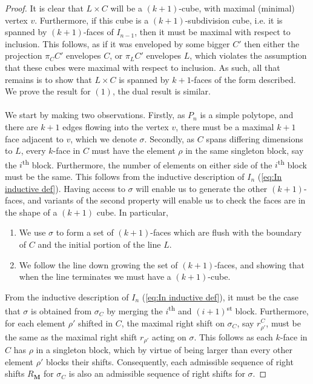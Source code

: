\documentclass{amsart}
\newcommand{\Kurt}[1]{\todo[color=orange!30]{\rm #1 \\ \hfill --- K.}}
\theoremstyle{definition}
\newcommand{\ordinal}{\textsuperscript{th}} %
\newcommand{\ordinalst}{\textsuperscript{st}} %
\begin{document}
\begin{proof}
It is clear that $L \times C$ will be a $(k+1)$-cube, with maximal (minimal) vertex $v$.
Furthermore, if this cube is a $(k+1)$-subdivision cube, i.e. it is spanned by $(k+1)$-faces of $I_{n-1}$, then it must be maximal with respect to inclusion.
This follows, as if it was enveloped by some bigger $C'$ then either the projection $\pi_C C'$ envelopes $C$, or $\pi_L C'$ envelopes $L$, which violates the assumption that these cubes were maximal with respect to inclusion.
As such, all that remains is to show that $L\times C$ is spanned by $k+1$-faces of the form described.
We prove the result for $(1)$, the dual result is similar.
\\\\
We start by making two observations. \Kurt{Could pull out as lemmas}
Firstly, as $P_n$ is a simple polytope, and there are $k+1$ edges flowing into the vertex $v$, there must be a maximal $k+1$ face adjacent to $v$, which we denote $\sigma$.
Secondly, as $C$ spans differing dimensions to $L$, every $k$-face in $C$ must have the element $\rho$ in the same singleton block, say the $i$\ordinal{} block.
Furthermore, the number of elements on either side of the $i$\ordinal{} block must be the same.
This follows from the inductive description of $I_n$ (\cref{eq:In inductive def}).
Having access to $\sigma$ will enable us to generate the other $(k+1)$-faces, and variants of the second property will enable us to check the faces are in the shape of a $(k+1)$ cube. In particular,
\begin{enumerate}
    \item We use $\sigma$ to form a set of $(k+1)$-faces which are flush with the boundary of $C$ and the initial portion of the line $L$.
    \item We follow the line down growing the set of $(k+1)$-faces, and showing that when the line terminates we must have a $(k+1)$-cube.
\end{enumerate}
From the inductive description of $I_n$ (\cref{eq:In inductive def}), it must be the case that $\sigma$ is obtained from $\sigma_C$ by merging the $i$\ordinal{} and $(i+1)$\ordinalst{} block.
Furthermore, for each element $\rho'$ shifted in $C$, the maximal right shift on $\sigma_C$, say $r_{\rho'}^C$, must be the same as the maximal right shift $r_{\rho'}$ acting on $\sigma$.
This follows as each $k$-face in $C$ has $\rho$ in a singleton block, which by virtue of being larger than every other element $\rho'$ blocks their shifts.
Consequently, each admissible sequence of right shifts $R_{\mathbf{M}}$ for $\sigma_C$ is also an admissible sequence of right shifts for $\sigma$.

\end{proof}
\end{document}
